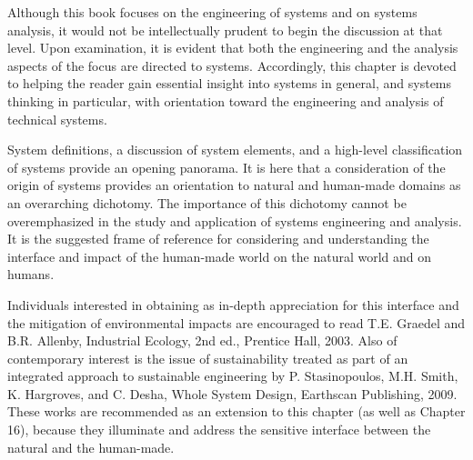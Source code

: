 Although this book focuses on the engineering of systems and on systems analysis, it would not be intellectually prudent to begin the discussion at that level. Upon examination, it is evident that both the engineering and the analysis aspects of the focus are directed to systems. Accordingly, this chapter is devoted to helping the reader gain essential insight into systems in general, and systems thinking in particular, with orientation toward the engineering and analysis of technical systems.

System definitions, a discussion of system elements, and a high-level classification of systems provide an opening panorama. It is here that a consideration of the origin of systems provides an orientation to natural and human-made domains as an overarching dichotomy. The importance of this dichotomy cannot be overemphasized in the study and application of systems engineering and analysis. It is the suggested frame of reference for considering and understanding the interface and impact of the human-made world on the natural world and on humans.

Individuals interested in obtaining as in-depth appreciation for this interface and the mitigation of environmental impacts are encouraged to read T.E. Graedel and B.R. Allenby, Industrial Ecology, 2nd ed., Prentice Hall, 2003. Also of contemporary interest is the issue of sustainability treated as part of an integrated approach to sustainable engineering by P. Stasinopoulos, M.H. Smith, K. Hargroves, and C. Desha, Whole System Design, Earthscan Publishing, 2009. These works are recommended as an extension to this chapter (as well as Chapter 16), because they illuminate and address the sensitive interface between the natural and the human-made.


